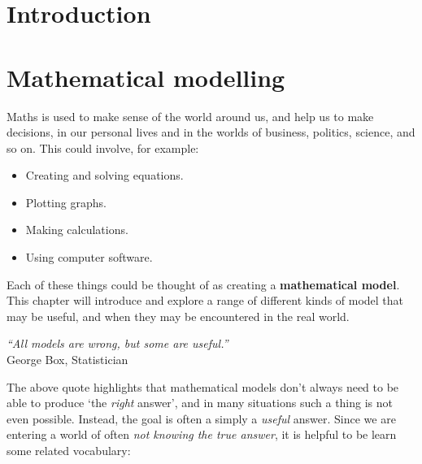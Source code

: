 \documentclass[
  11pt,
  openany]{book}
\author{}
\date{\vspace{-2.5em}}
\begin{document}
{
\setcounter{tocdepth}{1}
\tableofcontents
}
\mainmatter

\chapter*{Introduction}\label{introduction}

\chapter{Mathematical modelling}\label{mathematical-modelling}

\vspace{-1cm}


Maths is used to make sense of the world around us, and help us to make decisions, in our personal lives and in the worlds of business, politics, science, and so on. This could involve, for example:

\begin{itemize}[leftmargin=2.3cm]
    \item Creating and solving equations.
    \item Plotting graphs.
    \item Making calculations.
    \item Using computer software.
\end{itemize}

Each of these things could be thought of as creating a \textbf{mathematical model}. This chapter will introduce and explore a range of different kinds of model that may be useful, and when they may be encountered in the real world.

\begin{center}
    \begin{tcolorbox}[title=Quote,center,colback=DarkOrchid!5,colframe=DarkOrchid,width=10cm]
        \centering
        \textit{``All models are wrong, but some are useful.''}\\[0.2em]
        George Box, Statistician
    \end{tcolorbox}
\end{center}

The above quote highlights that mathematical models don't always need to be able to produce `the \emph{right} answer', and in many situations such a thing is not even possible. Instead, the goal is often a simply a \emph{useful} answer. Since we are entering a world of often \emph{not knowing the true answer}, it is helpful to be learn some related vocabulary:
\end{document}
